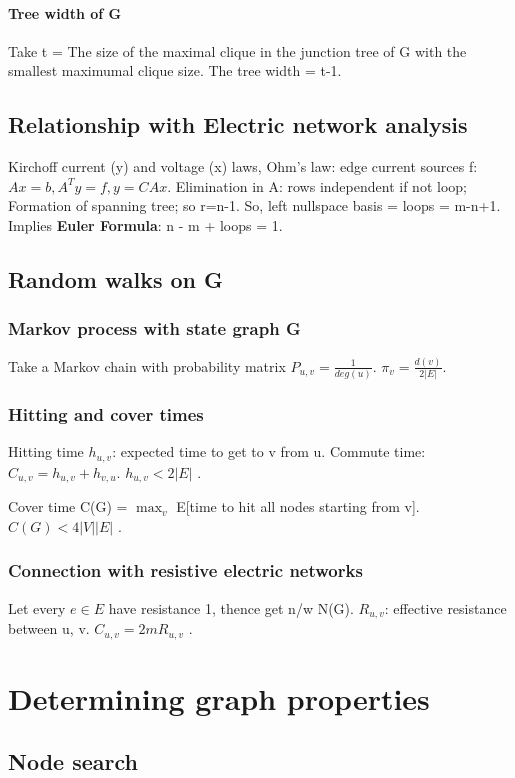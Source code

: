 \documentclass[oneside, article]{memoir}
\begin{document}
\subsection{Tree width of G}
Take t = The size of the maximal clique in the junction tree of G with the smallest maximumal clique size. The tree width  = t-1.

\chapter{Relationship with Electric network analysis}
Kirchoff current (y) and voltage (x) laws, Ohm's law: edge current sources f: $Ax=b, A^{T}y=f, y=CAx$. Elimination in A: rows independent if not loop; Formation of spanning tree; so r=n-1. So, left nullspace basis = loops = m-n+1. Implies \textbf{Euler Formula}: n - m + loops = 1.

\chapter{Random walks on G}
\section{Markov process with state graph G}
Take a Markov chain with probability matrix $P_{u, v} = \frac{1}{deg(u)}$. $\pi_{v}=\frac{d(v)}{2|E|}$. \chk

\section{Hitting and cover times}
Hitting time $h_{u,v}$: expected time to get to v from u. Commute time: $C_{u,v} = h_{u,v} + h_{v, u}$. $h_{u,v}<2|E|$ \why.

Cover time C(G) = $\max_{v}$ E[time to hit all nodes starting from v]. $C(G) < 4|V||E|$ \why.

\section{Connection with resistive electric networks}
Let every $e\in E$ have resistance 1, thence get n/w N(G). $R_{u,v}$: effective resistance between u, v. $C_{u, v} = 2m R_{u, v}$ \why.


\part{Determining graph properties}
\chapter{Node search}
\end{document}
